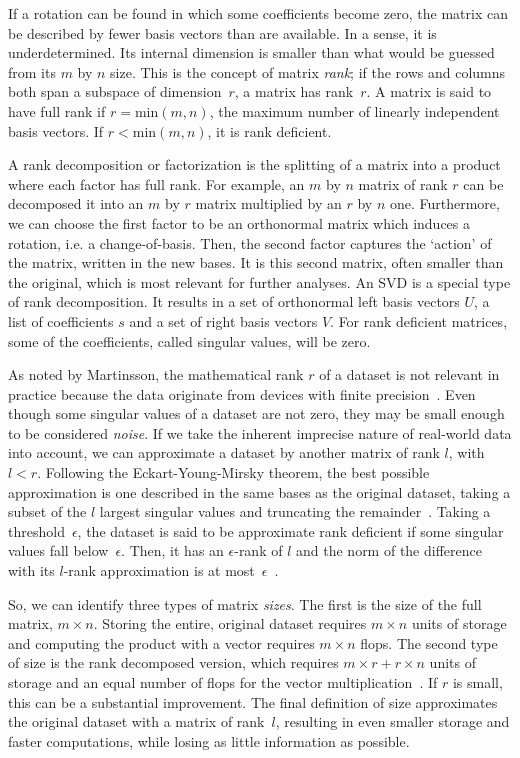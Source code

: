 \documentclass[ijgi,article,submit,moreauthors,pdftex,10pt,a4paper]{Definitions/mdpi}
\begin{document}
If a rotation can be found in which some coefficients become zero, the matrix can be described by fewer basis vectors than are available. In a sense, it is underdetermined. Its internal dimension is smaller than what would be guessed from its $m$ by $n$ size. This is the concept of matrix \textit{rank}; if the rows and columns both span a subspace of dimension~$r$, a matrix has rank~$r$. A matrix is said to have full rank if $r = \text{min}(m, n)$, the maximum number of linearly independent basis vectors. If $r < \text{min}(m, n)$, it is rank deficient.

A rank decomposition or factorization is the splitting of a matrix into a product where each factor has full rank. For example, an $m$ by $n$ matrix of rank $r$ can be decomposed it into an $m$ by $r$ matrix multiplied by an $r$ by $n$ one. Furthermore, we can choose the first factor to be an orthonormal matrix which induces a rotation, i.e. a change-of-basis. Then, the second factor captures the `action' of the matrix, written in the new bases. It is this second matrix, often smaller than the original, which is most relevant for further analyses. An SVD is a special type of rank decomposition. It results in a set of orthonormal left basis vectors $U$, a list of coefficients $s$ and a set of right basis vectors $V$. For rank deficient matrices, some of the coefficients, called singular values, will be zero.

As noted by Martinsson, the mathematical rank $r$ of a dataset is not relevant in practice because the data originate from devices with finite precision~\cite{Martinsson2016}. Even though some singular values of a dataset are not zero, they may be small enough to be considered \textit{noise}. If we take the inherent imprecise nature of real-world data into account, we can approximate a dataset by another matrix of rank $l$, with $l < r$. Following the Eckart-Young-Mirsky theorem, the best possible approximation is one described in the same bases as the original dataset, taking a subset of the $l$ largest singular values and truncating the remainder~\cite{Eckart1936}. Taking a threshold~$\epsilon$, the dataset is said to be approximate rank deficient if some singular values fall below~$\epsilon$. Then, it has an $\epsilon$-rank of $l$ and the norm of the difference with its $l$-rank approximation is at most~$\epsilon$~\cite{Martinsson2016}.

So, we can identify three types of matrix \textit{sizes}. The first is the size of the full matrix, $m \times n$. Storing the entire, original dataset requires $m \times n$ units of storage and computing the product with a vector requires $m \times n$ flops. The second type of size is the rank decomposed version, which  requires $m \times r + r \times n$ units of storage and an equal number of flops for the vector multiplication~\cite{Martinsson2016}. If $r$ is small, this can be a substantial improvement. The final definition of size approximates the original dataset with a matrix of rank~$l$, resulting in even smaller storage and faster computations, while losing as little information as possible.
\end{document}
